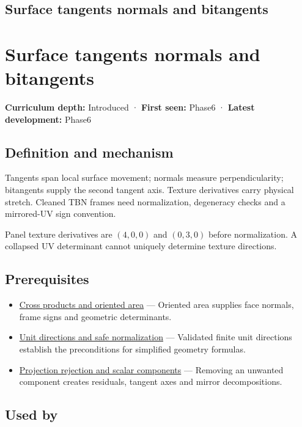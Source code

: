 \hypertarget{appendix-e31893dec985}{}
\section*{Surface tangents normals and bitangents}
\chapter{Surface tangents normals and bitangents}\label{appendix-e31893dec985-surface-tangents-normals-and-bitangents}

\textbf{Curriculum depth:} Introduced · \textbf{First seen:} Phase6 · \textbf{Latest development:} Phase6

\section{Definition and mechanism}\label{appendix-e31893dec985-definition-and-mechanism}

Tangents span local surface movement; normals measure perpendicularity; bitangents supply the second tangent axis. Texture derivatives carry physical stretch. Cleaned TBN frames need normalization, degeneracy checks and a mirrored-UV sign convention.

Panel texture derivatives are \((4,0,0)\) and \((0,3,0)\) before normalization. A collapsed UV determinant cannot uniquely determine texture directions.

\section{Prerequisites}\label{appendix-e31893dec985-prerequisites}

\begin{itemize}
\tightlist
\item
  \hyperref[appendix-2391db8052b1]{Cross products and oriented area} --- Oriented area supplies face normals, frame signs and geometric determinants.
\item
  \hyperref[appendix-f744e41b95b4]{Unit directions and safe normalization} --- Validated finite unit directions establish the preconditions for simplified geometry formulas.
\item
  \hyperref[appendix-505a502c372a]{Projection rejection and scalar components} --- Removing an unwanted component creates residuals, tangent axes and mirror decompositions.
\end{itemize}

\section{Used by}\label{appendix-e31893dec985-used-by}

